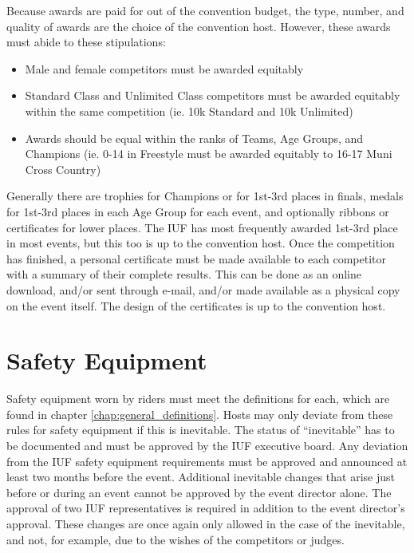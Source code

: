 Because awards are paid for out of the convention budget, the type, number, and quality of awards are the choice of the convention host.
However, these awards must abide to these stipulations:
\begin{itemize}
\item Male and female competitors must be awarded equitably
\item Standard Class and Unlimited Class competitors must be awarded equitably within the same competition (ie. 10k Standard and 10k Unlimited)
\item Awards should be equal within the ranks of Teams, Age Groups, and Champions (ie. 0-14 in Freestyle must be awarded equitably to 16-17 Muni Cross Country)
\end{itemize}

Generally there are trophies for Champions or for 1st-3rd places in finals, medals for 1st-3rd places in each Age Group for each event, and optionally ribbons or certificates for lower places.
The IUF has most frequently awarded 1st-3rd place in most events, but this too is up to the convention host.
Once the competition has finished, a personal certificate must be made available to each competitor with a summary of their complete results.
This can be done as an online download, and/or sent through e-mail, and/or made available as a physical copy on the event itself.
The design of the certificates is up to the convention host.

\section{Safety Equipment}

Safety equipment worn by riders must meet the definitions for each, which are found in chapter \ref{chap:general_definitions}.
Hosts may only deviate from these rules for safety equipment if this is inevitable.
The status of ``inevitable'' has to be documented and must be approved by the IUF executive board.
Any deviation from the IUF safety equipment requirements must be approved and announced at least two months before the event.
Additional inevitable changes that arise just before or during an event cannot be approved by the event director alone.
The approval of two IUF representatives is required in addition to the event director's approval.
These changes are once again only allowed in the case of the inevitable, and not, for example, due to the wishes of the competitors or judges.

